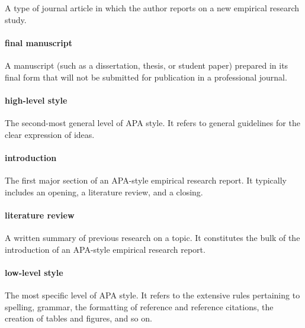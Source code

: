 \documentclass[
]{krantz}
\begin{document}
A type of journal article in which the author reports on a new empirical research study.

\paragraph*{final manuscript}\label{final-manuscript}

A manuscript (such as a dissertation, thesis, or student paper) prepared in its final form that will not be submitted for publication in a professional journal.

\paragraph*{high-level style}\label{high-level-style}

The second-most general level of APA style. It refers to general guidelines for the clear expression of ideas.

\paragraph*{introduction}\label{introduction-1}

The first major section of an APA-style empirical research report. It typically includes an opening, a literature review, and a closing.

\paragraph*{literature review}\label{literature-review}

A written summary of previous research on a topic. It constitutes the bulk of the introduction of an APA-style empirical research report.

\paragraph*{low-level style}\label{low-level-style}

The most specific level of APA style. It refers to the extensive rules pertaining to spelling, grammar, the formatting of reference and reference citations, the creation of tables and figures, and so on.
\end{document}
